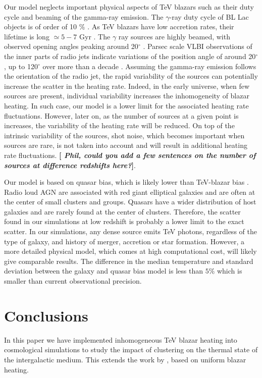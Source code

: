 \documentclass[numberedappendix]{emulateapj}
\newcommand\ALc[1]{{\color{red} \bf #1}} %
\begin{document}
Our model neglects important physical aspects of TeV blazars such as their duty cycle and beaming of the gamma-ray emission. The $\gamma$-ray duty cycle of BL Lac objects is of order of 10 $\%$ \citep{1996ApJ...464..600S}. As TeV blazars have low accretion rates, their lifetime is long $\simeq 5-7$ Gyr \citep{2002ApJ...571..226C}. The $\gamma$ ray sources are highly beamed, with observed opening angles peaking around 20$^{\circ}$ \citep{2009A&A...507L..33P}. Parsec scale VLBI observations of the inner parts of radio jets indicate variations of the position angle of around 20$^{\circ}$, up to 120$^{\circ}$ over more than a decade \citep{2013AJ....146..120L}. Assuming the gamma-ray emission follows the orientation of the radio jet, the rapid variability of the sources can potentially increase the scatter in the heating rate. Indeed, in the early universe, when few sources are present,  individual variability increases the inhomogeneity of blazar heating. In such case, our model is a lower limit for the associated heating rate fluctuations. However, later on, as the number of sources at a  given point is increases, the variability of the heating rate will be reduced.  On top of the intrinsic  variability  of the sources, shot noise, which becomes important when sources are rare, is not taken into account and will result in additional heating rate fluctuations.\ALc{[{ \em Phil, could you add a few sentences on the number of sources at difference redshifts here?}]}.

Our model is based on quasar bias, which is likely lower than TeV-blazar bias \citep{2014arXiv1410.0358A}. Radio loud AGN are associated with red giant elliptical galaxies \citep{2007A&A...476..723H} and are often at the center of small clusters and groups. Quasars have a wider distribution of host galaxies and are rarely found at the center of clusters. Therefore, the scatter found in our simulations at low redshift is probably a lower limit to the exact scatter. In our simulations, any dense source emits TeV photons, regardless of the type of galaxy, and history of merger, accretion or star formation. However, a more detailed physical model, which comes at high computational cost, will likely give comparable results. The difference in the median temperature and standard deviation between the galaxy and quasar bias model is less than $5\%$ which is smaller than current observational precision.
\section{Conclusions}
In this paper we have implemented inhomogeneous TeV blazar heating into cosmological simulations to study the impact of clustering on the thermal state of the intergalactic medium. This extends the work by \citet{2012ApJ...752...23C,2012MNRAS.423..149P}, based on uniform blazar heating.
\end{document}
